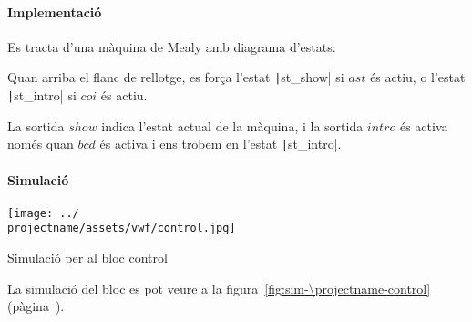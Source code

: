 \paragraph{Implementació}




Es tracta d'una màquina de Mealy amb diagrama d'estats:


Quan arriba el flanc de rellotge, es força l'estat \texttt|st_show| si $ast$ és
actiu, o l'estat \texttt|st_intro| si $coi$ és actiu.

La sortida $show$ indica l'estat actual de la màquina, i la sortida $intro$ és activa
només quan $bcd$ és activa i ens trobem en l'estat \texttt|st_intro|.

\paragraph{Simulació}

\begin{contendfig}
  \begin{center}
    \texttt{[image: ../\\projectname/assets/vwf/control.jpg]}
  \end{center}
  \caption{\label{fig:sim-\projectname-control} Simulació per al bloc \textsf{control}}
\end{contendfig}

La simulació del bloc es pot veure a la figura~\ref{fig:sim-\projectname-control} (pàgina~\pageref{fig:sim-\projectname-control}).


\vspace{1cm}
